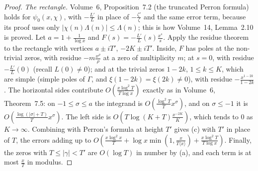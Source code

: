 \begin{proof}
\emph{The rectangle.} Volume~6, Proposition~7.2 (the truncated Perron formula) holds for $\psi_0(x,\chi)$, with $-\frac{L'}L$ in place of $-\frac{\zeta'}\zeta$ and the same error term, because its proof uses only $|\chi(n)\Lambda(n)|\le\Lambda(n)$; this is how Volume~14, Lemma~2.10 is proved. Let $a=1+\frac1{\log x}$ and $F(s)=-\frac{L'}L(s)\frac{x^s}s$. Apply the residue theorem to the rectangle with vertices $a\pm iT'$, $-2K\pm iT'$. Inside, $F$ has poles at the non-trivial zeros, with residue $-m\frac{x^\rho}\rho$ at a zero of multiplicity $m$; at $s=0$, with residue $-\frac{L'}L(0)$ (recall $L(0)\ne0$); and at the trivial zeros $1-2k$, $1\le k\le K$, which are simple (simple poles of $\Gamma$, and $\xi(1-2k)=\xi(2k)\ne0$), with residue $-\frac{x^{1-2k}}{1-2k}$. The horizontal sides contribute $O(\frac{x\log^2T}{T\log x})$ exactly as in Volume~6, Theorem~7.5: on $-1\le\sigma\le a$ the integrand is $O(\frac{\log^2T}Tx^\sigma)$, and on $\sigma\le-1$ it is $O(\frac{\log(|\sigma|+T)}Tx^\sigma)$. The left side is $O(T\log(K+T)\frac{x^{-2K}}{K})$, which tends to $0$ as $K\to\infty$. Combining with Perron's formula at height $T'$ gives (c) with $T'$ in place of $T$, the errors adding up to $O(\frac{x\log^2x}T+\log x\min(1,\frac x{T\langle x\rangle})+\frac{x\log^2T}{T\log x})$. Finally, the zeros with $T\le|\gamma|<T'$ are $O(\log T)$ in number by (a), and each term is at most $\frac xT$ in modulus.
\end{proof}


